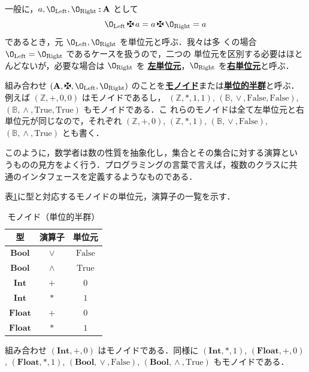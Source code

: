 \documentclass[a5paper,twoside,fleqn]{jsbook}
\newcommand{\keyword}[1]{{\underline{\textbf{#1}}}}
\newcommand{\mSpecialConstant}[1]{\textrm{#1}} %
\newcommand{\mFalse}{\mSpecialConstant{False}}
\newcommand{\mTrue}{\mSpecialConstant{True}}
\newcommand{\mZero}{\O}
\DeclareMathOperator{\mIn}{{:\!:}}
\DeclareMathOperator{\mLogicalAnd}{\wedge}
\DeclareMathOperator{\mLogicalOr}{\vee}
\DeclareMathOperator{\mPlus}{\maltese}
\newcommand{\mSpecialSub}[1]{\text{#1}}
\newcommand{\mLeft}{\mSpecialSub{Left}}
\newcommand{\mRight}{\mSpecialSub{Right}}
\newcommand{\mSet}[1]{\mathbf{#1}}
\newcommand{\mSpecialSet}[1]{\mathbb{#1}} %
\newcommand{\mBSet}{\mSpecialSet{B}}
\newcommand{\mZSet}{\mSpecialSet{Z}}
\newcommand{\mType}[1]{\mathbf{#1}}
\newcommand{\mBoolType}{\mType{Bool}}
\newcommand{\mFloatType}{\mType{Float}}
\newcommand{\mIntType}{\mType{Int}}
\newcommand{\mTupleWith}[1]{\left(#1\right)}
\begin{document}
一般に，$a,\mZero_\mLeft,\mZero_\mRight\mIn\mSet{A}$ として
\begin{equation}
\label{eq:identity}
\mZero_\mLeft\mPlus a=a\mPlus\mZero_\mRight=a
\end{equation}
であるとき，元 $\mZero_\mLeft,\mZero_\mRight$ を単位元と呼ぶ．我々は多
くの場合 $\mZero_\mLeft=\mZero_\mRight$ であるケースを扱うので，二つの
単位元を区別する必要はほとんどないが，必要な場合は $\mZero_\mRight$ を
\keyword{左単位元}，$\mZero_\mRight$ を\keyword{右単位元}と呼ぶ．

組み合わせ $\mTupleWith{\mSet{A},\mPlus,\mZero_\mLeft,\mZero_\mRight}$
のことを\keyword{モノイド}または\keyword{単位的半群}と呼ぶ．例えば
$\mTupleWith{\mZSet,+,0,0}$ はモノイドであるし，
$\mTupleWith{\mZSet,*,1,1}$,
$\mTupleWith{\mBSet,\mLogicalOr,\mFalse,\mFalse}$,
$\mTupleWith{\mBSet,\mLogicalAnd,\mTrue,\mTrue}$ もモノイドである．こ
れらのモノイドは全て左単位元と右単位元が同じなので，それぞれ
$\mTupleWith{\mZSet,+,0}$, $\mTupleWith{\mZSet,*,1}$,
$\mTupleWith{\mBSet,\mLogicalOr,\mFalse}$,
$\mTupleWith{\mBSet,\mLogicalAnd,\mTrue}$ とも書く．

このように，数学者は数の性質を抽象化し，集合とその集合に対する演算とい
うものの見方をよく行う．プログラミングの言葉で言えば，複数のクラスに共
通のインタフェースを定義するようなものである．

表\ref{tab:monoids}に型と対応するモノイドの単位元，演算子の一覧を示す．

\begin{table}
\caption{モノイド（単位的半群）}
\label{tab:monoids}
\begin{center}
\begin{tabular}{||c||c|c||}
\hline 型&演算子&単位元\\ \hline\hline $\mBoolType$ &$\vee$
&$\mFalse$\\ \hline $\mBoolType$ &$\wedge$ &$\mTrue$\\ \hline
$\mIntType$ &$+$ &$0$\\ \hline $\mIntType$ &$*$ &$1$\\ \hline
$\mFloatType$ &$+$ &$0$\\ \hline $\mFloatType$ &$*$ &$1$\\ \hline
\end{tabular}
\end{center}
\end{table}

組み合わせ $\mTupleWith{\mIntType,+,0}$ はモノイドである．同様に
$\mTupleWith{\mIntType,*,1}$, $\mTupleWith{\mFloatType,+,0}$,
$\mTupleWith{\mFloatType,*,1}$,
$\mTupleWith{\mBoolType,\mLogicalOr,\mFalse}$,
$\mTupleWith{\mBoolType,\mLogicalAnd,\mTrue}$ もモノイドである．
\end{document}
